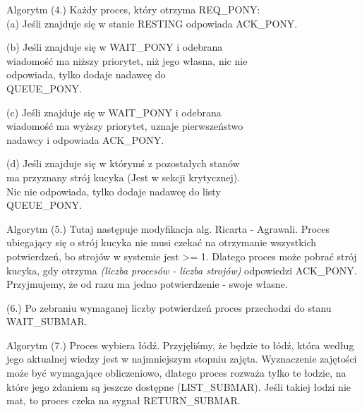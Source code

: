 \documentclass{beamer}
\newcommand\tab[1][1cm]{\hspace*{#1}}
\begin{document}
\begin{frame}{Algorytm}
    \internallinenumbers
    (4.) Każdy proces, który otrzyma REQ\_PONY: \\
        \tab[0.4cm] (a) Jeśli znajduje się w stanie RESTING odpowiada
        \tab[1cm] ACK\_PONY.

        \tab[0.4cm] (b) Jeśli znajduje się w WAIT\_PONY i odebrana\\
        \tab[1cm] wiadomość ma niższy priorytet, niż jego własna, nic nie\\
        \tab[1cm] odpowiada, tylko dodaje nadawcę do\\
        \tab[1cm] QUEUE\_PONY.
        
        \tab[0.4cm] (c) Jeśli znajduje się w WAIT\_PONY i odebrana\\
        \tab[1cm] wiadomość ma wyższy priorytet, uznaje pierwszeństwo  \\
        \tab[1cm] nadawcy i odpowiada ACK\_PONY.

        \tab[0.4cm] (d) Jeśli znajduje się w którymś z pozostałych stanów \\
        \tab[1cm] ma przyznany strój kucyka (Jest w sekcji krytycznej). \\
        \tab[1cm] Nic nie odpowiada, tylko dodaje nadawcę do listy \\
        \tab[1cm] QUEUE\_PONY.
\end{frame}

\begin{frame}{Algorytm}
    \internallinenumbers
    (5.) Tutaj następuje modyfikacja alg. Ricarta - Agrawali. Proces ubiegający się o strój kucyka nie musi czekać na otrzymanie wszystkich potwierdzeń, bo strojów w systemie jest >= 1. Dlatego proces może pobrać strój kucyka, gdy otrzyma \textit{(liczba procesów - liczba strojów)} odpowiedzi ACK\_PONY. Przyjmujemy, że od razu ma jedno potwierdzenie - swoje własne.

    \vspace{0.5cm}
    (6.) Po zebraniu wymaganej liczby potwierdzeń proces przechodzi do stanu WAIT\_SUBMAR.

\end{frame}

\begin{frame}{Algorytm}
    \internallinenumbers
    (7.) Proces wybiera łódź. Przyjęliśmy, że będzie to łódź, która według jego aktualnej wiedzy jest w najmniejszym stopniu zajęta. Wyznaczenie zajętości może być wymagające obliczeniowo, dlatego proces rozważa tylko te łodzie, na które jego zdaniem są jeszcze dostępne (LIST\_SUBMAR). Jeśli takiej łodzi nie mat, to proces czeka na sygnał RETURN\_SUBMAR.
\end{frame}
\end{document}
